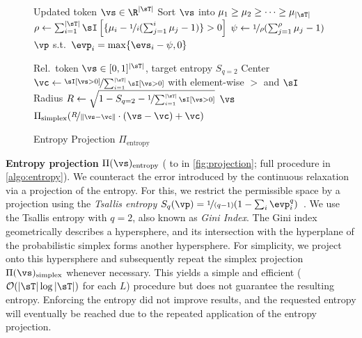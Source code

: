\documentclass{article}
\theoremstyle{plain}
\theoremstyle{definition}
\theoremstyle{remark}
\begin{document}
\begin{figure}[t]
\begin{minipage}{0.59\textwidth}
        \vspace{-17pt}
        \begin{algorithm}[H]
          \small 
          \caption{Simplex Projection \(\Pi_{\text{simplex}}\)}
          \label{algo:simplex}
            \begin{algorithmic}[1]
             Updated token \(\vs \in \R^{|\sT|}\)
            \State Sort \(\vs\) into \(\mu_1 \ge \mu_2 \ge \dots \ge \mu_{|\sT|}\)
            \State \(\rho \leftarrow \sum_{i=1}^{|\sT|} \sI \left[ \{ \mu_i - \nicefrac{1}{i} (\sum_{j=1}^i \mu_j - 1) \} > 0 \right]\)
            \State \(\psi \leftarrow \nicefrac{1}{\rho} (\sum_{j = 1}^\rho \mu_j - 1)\)
             \(\vp\) s.t.\ \(\evp_i = \max\{\evs_i - \psi, 0\}\)
          \end{algorithmic}
        \end{algorithm}
        \vspace{-17pt}
        \begin{algorithm}[H]
          \small 
          \caption{Entropy Projection \(\Pi_{\text{entropy}}\)}
          \label{algo:entropy}
            \begin{algorithmic}[1]
             Rel.\ token \(\vs \in [0, 1]^{|\sT|}\), target entropy \(S_{q=2}\)
            \State Center \(\vc \leftarrow \nicefrac{\sI[\vs > 0]}{\sum_{i=1}^{|\sT|} \sI[\vs > 0]}\) with element-wise \(>\) and \(\sI\)
            \State Radius \(R \leftarrow \sqrt{1 - S_{q=2} - \nicefrac{1}{\sum_{i=1}^{|\sT|} \sI[\vs > 0]}}\)
                 \(\vs\)
            \Else
                 \(\Pi_{\text{simplex}}(\nicefrac{R}{\|\vs - \vc\|} \cdot (\vs - \vc) + \vc)\)
            \EndIf
          \end{algorithmic}
        \end{algorithm}
    \end{minipage}
\end{figure}

\textbf{Entropy projection} \(\Pi(\vs)_{\text{entropy}}\) ( to  in \autoref{fig:projection}; full procedure in \autoref{algo:entropy}). We counteract the error introduced by the continuous relaxation via a projection of the entropy. For this, we restrict the permissible space by a projection using the \emph{Tsallis entropy} \(S_q(\vp) = \nicefrac{1}{(q - 1)} (1 - \sum_i \evp_i^q)\)~\citep{tsallis_possible_1988}. We use the Tsallis entropy with \(q=2\), also known as \emph{Gini Index}. The Gini index geometrically describes a hypersphere, and its intersection with the hyperplane of the probabilistic simplex forms another hypersphere. For simplicity, we project onto this hypersphere and subsequently repeat the simplex projection \(\Pi(\vs)_{\text{simplex}}\) whenever necessary. This yields a simple and efficient (\(\mathcal{O}(|\sT| \log |\sT|)\) for each \(L\)) procedure but does not guarantee the resulting entropy. Enforcing the entropy did not improve results, and the requested entropy will eventually be reached due to the repeated application of the entropy projection.
\end{document}
